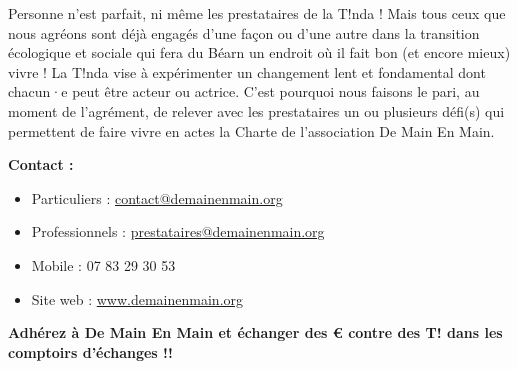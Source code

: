     \vspace{.2cm}

\noindent Personne n’est parfait, ni même les prestataires de la T!nda ! Mais tous ceux que nous agréons sont déjà engagés d’une façon ou d’une autre dans la transition écologique et sociale qui fera du Béarn un endroit où il fait bon (et encore mieux) vivre ! La T!nda vise à expérimenter un changement lent et fondamental dont chacun·e peut être acteur ou actrice. C'est pourquoi nous faisons le pari, au moment de l'agrément, de relever avec les prestataires un ou plusieurs défi(s) qui permettent de faire vivre en actes la Charte de l'association De Main En Main.
    \vspace{.5cm}


      \textbf{Contact :}
    \begin{itemize}
      \item[] Particuliers : \href{mailto:contact@demainenmain.org}{contact@demainenmain.org}
      \item[] Professionnels : \href{mailto:prestataires@demainenmain.org}{prestataires@demainenmain.org}
      \item[] Mobile : 07 83 29 30 53 
      \item[] Site web : \href{https://www.demainenmain.org}{www.demainenmain.org}
    \end{itemize}

    \vspace{1cm}

  \begin{center}
    {\Large \textbf{Adhérez à De Main En Main et échanger des € contre des T! dans les comptoirs d’échanges !!}}
  \end{center}
